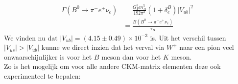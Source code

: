 \documentclass[../main.tex]{subfiles}
\begin{document}
\begin{equation}
    \begin{aligned}
        \label{eq:b_zwak_verval}
        \Gamma\left(B^{0} \rightarrow \pi^{-} e^{+} \nu_{e}\right) &=\frac{G_{F}^{2} m_{B}^{5}}{192 \pi^{3}}\left(1+\delta_{e}^{B}\right)\left|V_{u b}\right|^{2} \\
                                                                   &=\frac{B\left(B^{0} \rightarrow \pi^{-} e^{+} \nu_{e}\right)}{\tau_{B}}
    \end{aligned}
\end{equation}
We vinden nu dat $\left|V_{u b}\right|=(4.15 \pm 0.49) \times 10^{-3}$ is.\newpage
Uit het verschil tussen $\left|V_{us}\right| > \left|V_{u b}\right|$ kunne we direct inzien dat het verval via $W^+$ naar een pion veel onwaarschijnlijker is voor het $B$ meson dan voor het $K$ meson.\\
Zo is het mogelijk om voor alle andere CKM-matrix elementen deze ook experimenteel te bepalen:
\end{document}
